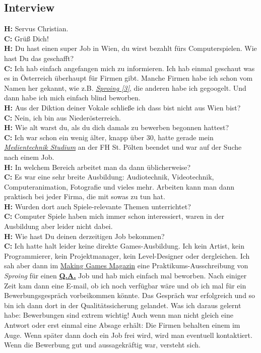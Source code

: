 \documentclass[10pt,a4paper,ngerman,twoside]{article} %
\begin{document}
\subsection*{Interview}
\textbf{H:} Servus Christian. \\
\textbf{C:} Grüß Dich! \\
\textbf{H:} Du hast einen super Job in Wien, du wirst bezahlt fürs Computerspielen. Wie hast Du das geschafft? \\
\textbf{C:} Ich hab einfach angefangen mich zu informieren. Ich hab einmal geschaut was es in Österreich überhaupt für Firmen gibt. Manche Firmen habe ich schon vom Namen her gekannt, wie z.B. \href{https://www.sproing.at/}{\textit{Sproing [3]}}, die anderen habe ich gegoogelt. Und dann habe ich mich einfach blind beworben. \\
\textbf{H:} Aus der Diktion deiner Vokale schließe ich dass bist nicht aus Wien bist? \\
\textbf{C:} Nein, ich bin aus Niederösterreich. \\
\textbf{H:} Wie alt warst du, als du dich damals zu bewerben begonnen hattest? \\
\textbf{C:} Ich war schon ein wenig älter, knapp über 30, hatte gerade mein \href{http://www.fhstp.ac.at/studienangebot/bachelor/mt}{\textit{Medientechnik Studium}} an der FH St. Pölten beendet und war auf der Suche nach einem Job. \\
\textbf{H:} In welchem Bereich arbeitet man da dann üblicherweise? \\
\textbf{C:} Es war eine sehr breite Ausbildung: Audiotechnik, Videotechnik, Computeranimation, Fotografie und vieles mehr. Arbeiten kann man dann praktisch bei jeder Firma, die mit sowas zu tun hat. \\
\textbf{H:} Wurden dort auch Spiele-relevante Themen unterrichtet? \\
\textbf{C:} Computer Spiele haben mich immer schon interessiert, waren in der 
Ausbildung aber leider nicht dabei. \\
\textbf{H:} Wie hast Du deinen derzeitigen Job bekommen? \\
\textbf{C:} Ich hatte halt leider keine direkte Games-Ausbildung. Ich kein Artist, kein Programmierer, kein Projektmanager, kein Level-Designer oder dergleichen. Ich sah aber dann im \href{http://www.makinggames.de/}{Making Games Magazin} eine Praktikums-Ausschreibung von \textit{Sproing} für einen \href{https://de.wikipedia.org/wiki/Quality_Assurance}{\textbf{Q.A.}} Job und hab mich einfach mal beworben. Nach einiger Zeit kam dann eine E-mail, ob ich noch verfügbar wäre und ob ich mal für ein Bewerbungsgespräch vorbeikommen könnte. Das Gespräch war erfolgreich und so bin ich dann dort in der Qualitätssicherung gelandet. Was ich daraus gelernt habe:  Bewerbungen sind extrem wichtig! Auch wenn man nicht gleich eine Antwort oder erst einmal eine Absage erhält: Die Firmen behalten einem im Auge. Wenn später dann doch ein Job frei wird, wird man eventuell kontaktiert. Wenn die Bewerbung gut und aussagekräftig war, versteht sich. \\
\end{document}
